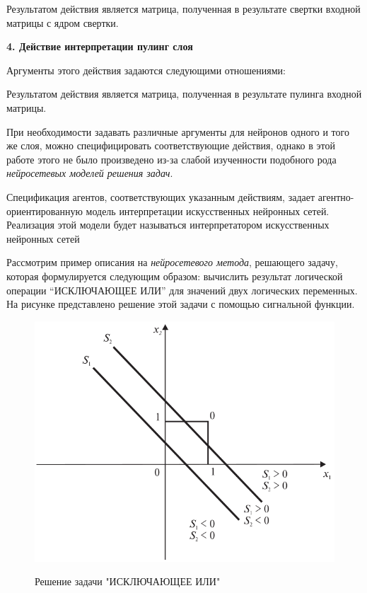 Результатом действия является матрица, полученная в результате свертки входной матрицы с ядром свертки.


\textbf{4. Действие интерпретации пулинг слоя}

Аргументы этого действия задаются следующими отношениями:
\begin{SCn}



\end{SCn}

Результатом действия является матрица, полученная в результате пулинга входной матрицы.

При необходимости задавать различные аргументы для нейронов одного и того же слоя, можно специфицировать соответствующие действия, однако в этой работе этого не было произведено из-за слабой изученности подобного рода \textit{нейросетевых моделей решения задач}.

Спецификация агентов, соответствующих указанным действиям, задает агентно-ориентированную модель интерпретации искусственных нейронных сетей. Реализация этой модели будет называться интерпретатором искусственных нейронных сетей

Рассмотрим пример описания на \textit{нейросетевого метода}, решающего задачу, которая формулируется следующим образом: вычислить результат логической операции ``ИСКЛЮЧАЮЩЕЕ ИЛИ'' для значений двух логических переменных. На рисунке \textit{} представлено решение этой задачи с помощью сигнальной функции.

\begin{figure}
	\centering
	\caption{Решение задачи "ИСКЛЮЧАЮЩЕЕ ИЛИ"{}}
	\includegraphics[width=0.5\linewidth]{author/part3/figures/strong_or_graphic.png}
	\label{fig:strong_or_graphic}
\end{figure}

